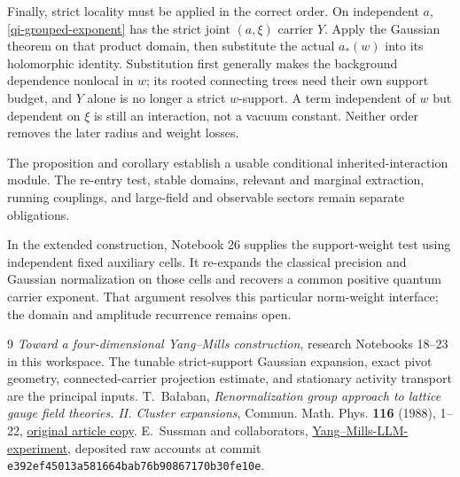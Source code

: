 \documentclass[11pt]{article}
\theoremstyle{remark}
\begin{document}
Finally, strict locality must be applied in the correct order.
On independent $a$, \eqref{qi-grouped-exponent} has the strict
joint $(a,\xi)$ carrier $Y$. Apply the Gaussian theorem on that
product domain, then substitute the actual $a_*(w)$ into its
holomorphic identity. Substitution first generally makes the
background dependence nonlocal in $w$; its rooted connecting
trees need their own support budget, and $Y$ alone is no
longer a strict $w$-support. A term independent of $w$ but
dependent on $\xi$ is still an interaction, not a vacuum
constant. Neither order removes the later radius and weight
losses.

The proposition and corollary establish a usable conditional
inherited-interaction module. The re-entry test, stable domains,
relevant and marginal extraction, running couplings, and
large-field and observable sectors remain separate obligations.

In the extended construction, Notebook 26 supplies the support-weight
test using independent fixed auxiliary cells. It re-expands the
classical precision and Gaussian normalization on those cells
and recovers a common positive quantum carrier exponent.
That argument resolves this particular norm-weight interface;
the domain and amplitude recurrence remains open.


\begin{thebibliography}{9}
\emph{Toward a four-dimensional Yang--Mills construction},
research Notebooks 18--23 in this workspace.
The tunable strict-support Gaussian expansion, exact pivot
geometry, connected-carrier projection estimate, and
stationary activity transport are the principal inputs.
T.~Ba\l aban,
\emph{Renormalization group approach to lattice gauge field
theories. II. Cluster expansions},
Commun. Math. Phys. \textbf{116} (1988), 1--22,
\href{https://scispace.com/pdf/renormalization-group-approach-to-lattice-gauge-field-4penm4k7hc.pdf}{original article copy}.
E.~Sussman and collaborators,
\href{https://github.com/ethanwsussman/Yang--Mills-LLM-experiment}{Yang--Mills-LLM-experiment},
deposited raw accounts at commit
\texttt{e392ef4501\allowbreak 3a581664ba\allowbreak b76b908671\allowbreak 70b30fe10e}.
\end{thebibliography}
\end{document}
